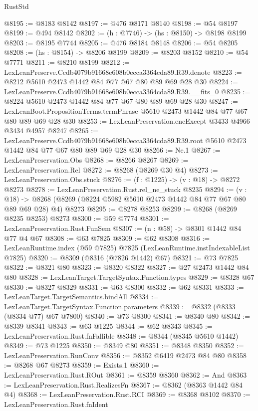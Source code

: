 \begin{lexlean}{RustStd}
\begin{coremodule}
@8195 := @8183 @8142
@8197 := @476 @8171 @8140
@8198 := @54 @8197
@8199 := @494 @8142
@8202 := (h : @7746) -> (hs : @8150) -> @8198 @8199
@8203 := @8195 @7744
@8205 := @476 @8184 @8148
@8206 := @54 @8205
@8208 := (hs : @8154) -> @8206 @8199
@8209 := @8203 @8152
@8210 := @54 @7771
@8211 := @8210 @8199
@8212 := LexLeanPreserve.Ccdb4079b91668e608b0ecca3364cda89.R39.denote
@8223 := @8212 @5610 @2473 @1442 @84 @77 @67 @80 @89 @69 @28 @30
@8224 := LexLeanPreserve.Ccdb4079b91668e608b0ecca3364cda89.R39.__fits_0
@8235 := @8224 @5610 @2473 @1442 @84 @77 @67 @80 @89 @69 @28 @30
@8247 := LexLeanBoot.PropositionTerms.termPhrase @5610 @2473 @1442 @84 @77 @67 @80 @89 @69 @28 @30
@8253 := LexLeanPreservation.encExcept @3433 @4966 @3434 @4957 @8247
@8265 := LexLeanPreserve.Ccdb4079b91668e608b0ecca3364cda89.R39.root
    @5610
    @2473
    @1442
    @84
    @77
    @67
    @80
    @89
    @69
    @28
    @30
@8266 := Ne.{1}
@8267 := LexLeanPreservation.Obs
@8268 := @8266 @8267
@8269 := LexLeanPreservation.Rel
@8272 := @8268 (@8269 @30 @4)
@8273 := LexLeanPreservation.Obs.stuck
@8276 := (f : @1225) -> (v : @18) -> @8272 @8273
@8278 := LexLeanPreservation.Rust.rel_ne_stuck @8235
@8294 := (v : @18) ->
  @8268 (@8269 (@8224 @5982 @5610 @2473 @1442 @84 @77 @67 @80 @89 @69 @28) @4) @8273
@8295 := @8278 @8253
@8299 := @8268 (@8269 @8235 @8253) @8273
@8300 := @59 @7774
@8301 := LexLeanPreservation.Rust.FunSem
@8307 := (n : @58) -> @8301 @1442 @84 @77 @4 @67
@8308 := @63 @7825
@8309 := @62 @8308
@8316 := LexLeanRuntime.index (@59 @7825) @7825 (LexLeanRuntime.instIndexableList @7825)
@8320 := @8309 (@8316 (@7826 @1442) @67)
@8321 := @73 @7825
@8322 := @8321 @80
@8323 := @8320 @8322
@8327 := @27 @2473 @1442 @84 @80
@8328 := LexLeanTarget.TargetSyntax.Function.types
@8329 := @8328 @67
@8330 := @8327 @8329
@8331 := @63 @8300
@8332 := @62 @8331
@8333 := LexLeanTarget.TargetSemantics.bindAll
@8334 := LexLeanTarget.TargetSyntax.Function.parameters
@8339 := @8332 (@8333 (@8334 @77) @67 @7800)
@8340 := @73 @8300
@8341 := @8340 @80
@8342 := @8339 @8341
@8343 := @63 @1225
@8344 := @62 @8343
@8345 := LexLeanPreservation.Rust.fnFallible
@8348 := @8344 (@8345 @5610 @1442)
@8349 := @73 @1225
@8350 := @8349 @80
@8351 := @8348 @8350
@8352 := LexLeanPreservation.RunConv
@8356 := @8352 @6419 @2473 @84 @80
@8358 := @8268 @67 @8273
@8359 := Exists.{1}
@8360 := LexLeanPreservation.Rust.ROut
@8361 := @8359 @8360
@8362 := And
@8363 := LexLeanPreservation.Rust.RealizesFn
@8367 := @8362 (@8363 @1442 @84 @4)
@8368 := LexLeanPreservation.Rust.RCI
@8369 := @8368 @8102
@8370 := LexLeanPreservation.Rust.fnIdent

\end{coremodule}
\end{lexlean}

